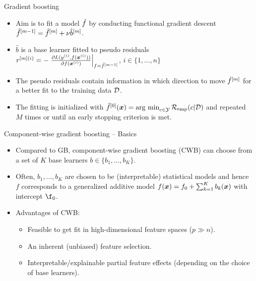 \documentclass[10pt]{beamer}
\begin{document}
\begin{frame}{Gradient boosting}
  \begin{itemize}
    \item
      Aim is to fit a model $\hat{f}$ by conducting functional gradient descent $\hat{f}^{[m-1]} = \hat{f}^{[m]} + \nu \hat{b}^{[m]}$.

    \item
      $\hat{b}$ is a base learner fitted to pseudo residuals $r^{[m](i)} = -\left.\frac{\partial L(y^{(i)}, f(\bm{x}^{(i)}))}{\partial f(\bm{x}^{(i)})}\right|_{f = \hat{f}^{[m-1]}}$, $i \in \{1, \dots, n\}$

    \item
      The pseudo residuals contain information in which direction to move $\hat{f}^{[m]}$ for a better fit to the training data $\mathcal{D}$.

    \item
      The fitting is initialized with $\hat{f}^{[0]}(\bm{x}) = \operatorname{arg~min}_{c\in\mathcal{Y}}\mathcal{R}_{\text{emp}}(c|\mathcal{D})$ and repeated $M$ times or until an early stopping criterion is met.
  \end{itemize}
\end{frame}

\begin{frame}{Component-wise gradient boosting -- Basics}
  \begin{itemize}
    \item
      Compared to GB, component-wise gradient boosting (CWB) can choose from a set of $K$ base learners $b \in \{b_1, \dots, b_K\}$.

    \item
      Often, $b_1, \dots, b_K$ are chosen to be (interpretable) statistical models and hence $f$ corresponds to a generalized additive model $f(\bm{x}) = f_0 + \sum_{k=1}^K b_k(\bm{x})$ with intercept $\f_0$.

    \item
      Advantages of CWB:
      \begin{itemize}
        \item
          Feasible to get fit in high-dimensional feature spaces ($p \gg n$).

        \item
          An inherent (unbiased) feature selection.

        \item
          Interpretable/explainable partial feature effects (depending on the choice of base learners).
      \end{itemize}
  \end{itemize}
\end{frame}
\end{document}
